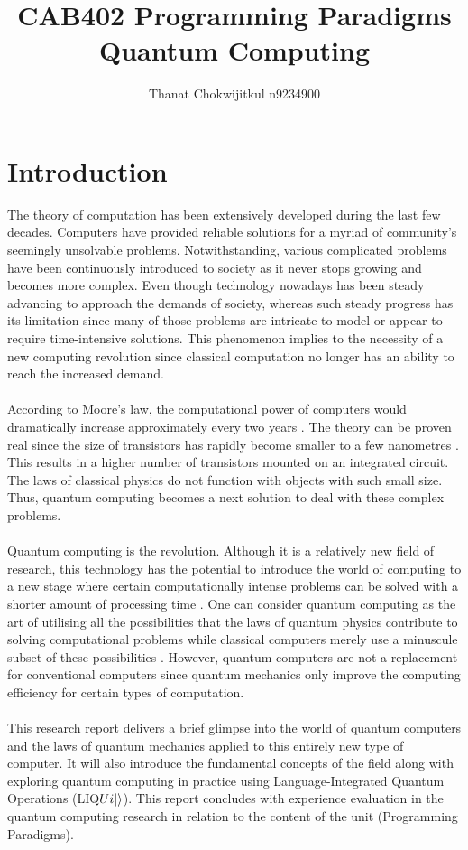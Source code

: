 \documentclass[12pt]{third-rep}
\title{CAB402 Programming Paradigms \\ \vspace{2 mm} {Quantum Computing}}
\author{Thanat Chokwijitkul n9234900}
\date{}
\begin{document}
\maketitle %

\tableofcontents


\chapter{Introduction}

The theory of computation has been extensively developed during the last few decades. Computers have provided reliable solutions for a myriad of community's seemingly unsolvable problems. Notwithstanding, various complicated problems have been continuously introduced to society as it never stops growing and becomes more complex. Even though technology nowadays has been steady advancing to approach the demands of society, whereas such steady progress has its limitation since many of those problems are intricate to model or appear to require time-intensive solutions. This phenomenon implies to the necessity of a new computing revolution since classical computation no longer has an ability to reach the increased demand. \\\\
According to Moore's law, the computational power of computers would dramatically increase approximately every two years \cite{moore}. The theory can be proven real since the size of transistors has rapidly become smaller to a few nanometres \cite{qc-info}. This results in a higher number of transistors mounted on an integrated circuit. The laws of classical physics do not function with objects with such small size. Thus, quantum computing becomes a next solution to deal with these complex problems. \\\\
Quantum computing is the revolution. Although it is a relatively new field of research, this technology has the potential to introduce the world of computing to a new stage where certain computationally intense problems can be solved with a shorter amount of processing time \cite{non-physicists}. One can consider quantum computing as the art of utilising all the possibilities that the laws of quantum physics contribute to solving computational problems while classical computers merely use a minuscule subset of these possibilities \cite{qc-cc}. However, quantum computers are not a replacement for conventional computers since quantum mechanics only improve the computing efficiency for certain types of computation. \\\\
This research report delivers a brief glimpse into the world of quantum computers and the laws of quantum mechanics applied to this entirely new type of computer. It will also introduce the fundamental concepts of the field along with exploring quantum computing in practice using Language-Integrated Quantum Operations (LIQ$Ui{\left\vert{}\right\rangle}$). This report concludes with experience evaluation in the quantum computing research in relation to the content of the unit (Programming Paradigms).
\end{document}
